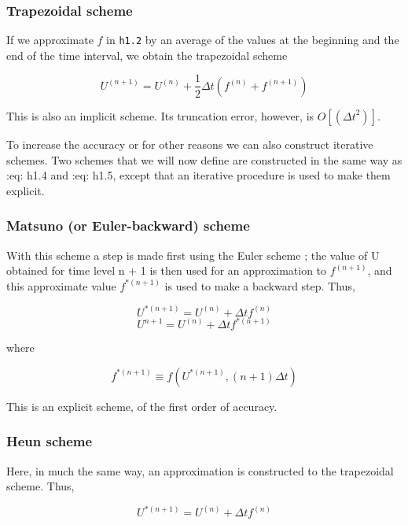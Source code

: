 \subsubsection{Trapezoidal scheme}\label{subsubsec:trapezoidal-scheme}

If we approximate \(f\) in \texttt{h1.2} by an average of the values at
the beginning and the end of the time interval, we obtain the
trapezoidal scheme

\[U^{( n + 1 )} = U^{( n )} + \frac{1}{2}\Delta t\left( f^{( n )} + f^{( n + 1 )} \right)\]

This is also an implicit scheme. Its truncation error, however, is
\(O\left[ \left( {\Delta t}^{2} \right) \right]\).

To increase the accuracy or for other reasons we can also construct
iterative schemes. Two schemes that we will now define are constructed
in the same way as :eq: {h1.4} and :eq: {h1.5}, except that an iterative
procedure is used to make them explicit.

\subsubsection{Matsuno (or Euler-backward) scheme}\label{subsubsec:matsuno-euler-backward-scheme}

With this scheme a step is made first using the Euler scheme ; the value
of U obtained for time level n + 1 is then used for an approximation to
\(f^{\left( n + 1 \right)}\), and this approximate value
\(f^{*\left( n + 1 \right)}\) is used to make a backward step. Thus,

\[U^{*\left( n + 1 \right)} = U^{\left( n \right)} + \Delta t  f^{\left( n \right)}\]\[U^{n + 1} = U^{\left( n \right)} + \Delta t  {f^{*\left( n + 1 \right)}}\]

where

\[{f^{*\left( n + 1 \right)}} \equiv f\left( U^{*\left( n + 1 \right)}, \left( n + 1 \right)\Delta t \right)\]

This is an explicit scheme, of the first order of accuracy.

\subsubsection{Heun scheme}\label{subsubsec:heun-scheme}

Here, in much the same way, an approximation is constructed to the
trapezoidal scheme. Thus,

\[U^{*\left( n + 1 \right)} = U^{\left( n \right)} + \Delta t  f^{\left( n \right)}\]

